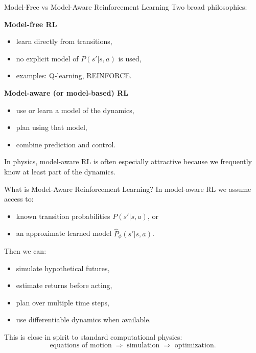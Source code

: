 \documentclass[aspectratio=169]{beamer}
\begin{document}
\begin{frame}{Model-Free vs Model-Aware Reinforcement Learning}
  Two broad philosophies:

  \textbf{Model-free RL}
  \begin{itemize}
  \item learn directly from transitions,
  \item no explicit model of $P(s'|s,a)$ is used,
  \item examples: Q-learning, REINFORCE.
  \end{itemize}

  \textbf{Model-aware (or model-based) RL}
  \begin{itemize}
  \item use or learn a model of the dynamics,
  \item plan using that model,
  \item combine prediction and control.
  \end{itemize}

  In physics, model-aware RL is often especially attractive because we frequently know at least part of the dynamics.
\end{frame}

\begin{frame}{What is Model-Aware Reinforcement Learning?}
  In model-aware RL we assume access to:
  \begin{itemize}
  \item known transition probabilities $P(s'|s,a)$, or
  \item an approximate learned model $\hat P_\phi(s'|s,a)$.
  \end{itemize}

  Then we can:
  \begin{itemize}
  \item simulate hypothetical futures,
  \item estimate returns before acting,
  \item plan over multiple time steps,
  \item use differentiable dynamics when available.
  \end{itemize}

  This is close in spirit to standard computational physics:
  \[
  \text{equations of motion} \;\Rightarrow\; \text{simulation} \;\Rightarrow\; \text{optimization}.
  \]
\end{frame}
\end{document}
